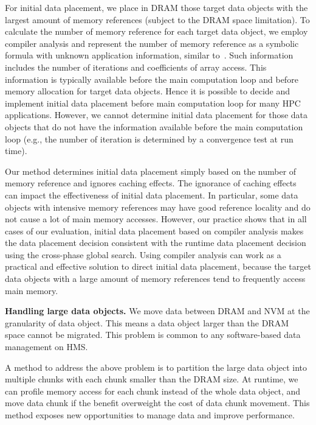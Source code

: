 For initial data placement, we place in DRAM those target data objects with the largest amount of memory references (subject to the DRAM space limitation).
To calculate the number of memory reference for each target data object, we employ compiler analysis and represent the number of memory reference
as a symbolic formula with unknown application information, similar to~\cite{icpcds99:ding}.
Such information includes the number of iterations and coefficients of array access. This information is typically available before the main computation loop and before memory allocation for target data objects.
Hence it is possible to decide and implement initial data placement before main computation loop for many HPC applications. 
However, we cannot determine initial data placement for those data objects that do not have the information available before the main computation loop (e.g., the number of iteration is determined by a convergence test at run time).

Our method determines initial data placement simply based on the number of memory reference and ignores caching effects.
The ignorance of caching effects can impact the effectiveness of initial data placement.
In particular, some data objects with intensive memory references may have good reference locality and do not cause a lot of main memory accesses.
However, our practice shows that in all cases of our evaluation, initial data placement based on compiler analysis makes the data placement decision consistent with the runtime data placement decision using the cross-phase global search.
Using compiler analysis can work as a practical and effective solution to direct initial data placement, because the target data objects with a large amount of memory references tend to frequently access main memory.

\textbf{Handling large data objects.} 
We move data between DRAM and NVM at the granularity of data object. This means a data object larger than the DRAM space cannot be migrated.
This problem is common to any software-based data management on HMS.

A method to address the above problem is to partition the large data object into multiple chunks with each chunk smaller than the DRAM size.
At runtime, we can profile memory access for each chunk instead of the whole data object, and move data chunk if the benefit overweight the cost of data chunk movement.
This method exposes new opportunities to manage data and improve performance.

